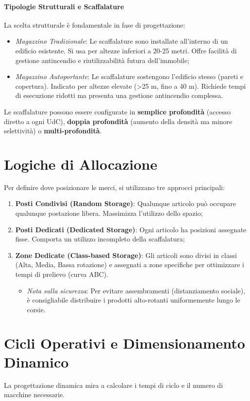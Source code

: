 \paragraph{Tipologie Strutturali e Scaffalature} La scelta strutturale è fondamentale in fase di progettazione:
\begin{itemize}
    \item \emph{Magazzino Tradizionale}: Le scaffalature sono installate all'interno di un edificio esistente. Si usa per altezze inferiori a 20-25 metri. Offre facilità di gestione antincendio e riutilizzabilità futura dell'immobile;
    \item \emph{Magazzino Autoportante}: Le scaffalature sostengono l'edificio stesso (pareti e copertura). Indicato per altezze elevate (>25 m, fino a 40 m). Richiede tempi di esecuzione ridotti ma presenta una gestione antincendio complessa.
\end{itemize}
Le scaffalature possono essere configurate in \textbf{semplice profondità} (accesso diretto a ogni UdC), \textbf{doppia profondità} (aumento della densità ma minore selettività) o \textbf{multi-profondità}.

%
\section{Logiche di Allocazione}
Per definire dove posizionare le merci, si utilizzano tre approcci principali:
\begin{enumerate}
    \item \textbf{Posti Condivisi (Random Storage)}: Qualunque articolo può occupare qualunque postazione libera. Massimizza l'utilizzo dello spazio;
    \item \textbf{Posti Dedicati (Dedicated Storage)}: Ogni articolo ha posizioni assegnate fisse. Comporta un utilizzo incompleto della scaffalatura;
    \item \textbf{Zone Dedicate (Class-based Storage)}: Gli articoli sono divisi in classi (Alta, Media, Bassa rotazione) e assegnati a zone specifiche per ottimizzare i tempi di prelievo (curva ABC).
          \begin{itemize}
              \item \emph{Nota sulla sicurezza}: Per evitare assembramenti (distanziamento sociale), è consigliabile distribuire i prodotti alto-rotanti uniformemente lungo le corsie.
          \end{itemize}
\end{enumerate}

%
\section{Cicli Operativi e Dimensionamento Dinamico}
La progettazione dinamica mira a calcolare i tempi di ciclo e il numero di macchine necessarie.
%
